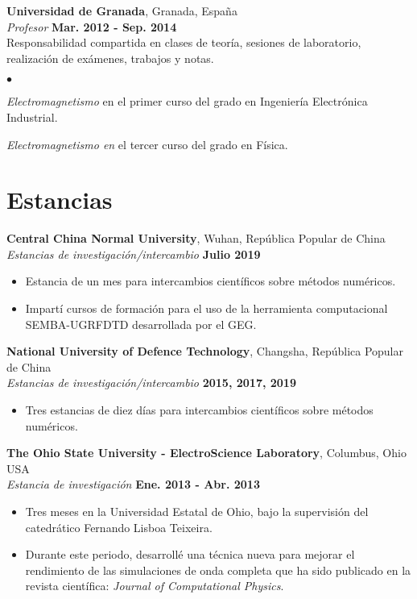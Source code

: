 \documentclass[a4paper,margin,line]{res}
\newenvironment{list2}{
  \begin{list}{$\bullet$}{%
      \setlength{\itemsep}{0in}
      \setlength{\parsep}{0in} \setlength{\parskip}{0in}
      \setlength{\topsep}{0in} \setlength{\partopsep}{0in} 
      \setlength{\leftmargin}{0.2in}}}{\end{list}}
\begin{document}
\begin{resume}
{\bf Universidad de Granada}, Granada, España\\
{\em Profesor} \hfill {\bf Mar. 2012 - Sep. 2014}\\
Responsabilidad compartida en clases de teoría, sesiones de laboratorio, realización de exámenes, trabajos y notas.
\vspace*{.05in}  
\begin{list2}
 \item \textit{Electromagnetismo} en el primer curso del grado en Ingeniería Electrónica Industrial.
 \item \textit{Electromagnetismo en} el tercer curso del grado en Física.
\end{list2}

\section{\sc Estancias}
\begin{minipage}{\textwidth}
	{\bf Central China Normal University}, Wuhan, República Popular de China\\
	{\em Estancias de investigación/intercambio} \hfill {\bf Julio 2019}
	\begin{itemize}
		\item Estancia de un mes para intercambios científicos sobre métodos numéricos.
		\item Impartí cursos de formación para el uso de la herramienta computacional SEMBA-UGRFDTD desarrollada por el GEG.
	\end{itemize}
\end{minipage}

\begin{minipage}{\textwidth}
	{\bf National University of Defence Technology}, Changsha, República Popular de China\\
	{\em Estancias de investigación/intercambio} \hfill {\bf 2015, 2017, 2019}
	\begin{itemize}
		\item Tres estancias de diez días para intercambios científicos sobre métodos numéricos.
	\end{itemize}
\end{minipage}

\begin{minipage}{\textwidth}
	{\bf The Ohio State University - ElectroScience Laboratory}, Columbus, Ohio USA\\
	{\em Estancia de investigación} \hfill {\bf Ene. 2013 - Abr. 2013}
	\begin{itemize}
		\item Tres meses en la Universidad Estatal de Ohio, bajo la supervisión del catedrático Fernando Lisboa Teixeira.
		\item Durante este periodo, desarrollé una técnica nueva para mejorar el rendimiento de las simulaciones de onda completa que ha sido publicado en la revista científica: {\it Journal of Computational Physics}.
	\end{itemize}
\end{minipage}


\end{resume}
\end{document}
